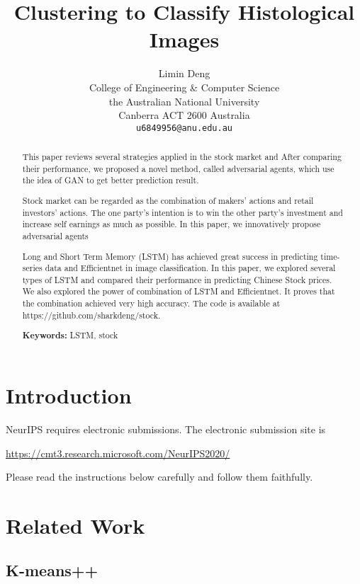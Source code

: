 \documentclass{article}
\title{Clustering to Classify Histological Images}
\author{%
  Limin Deng\\
  College of Engineering \& Computer Science \\
  the Australian National University\\
  Canberra ACT 2600 Australia\\
  \texttt{u6849956@anu.edu.au} \\
}
\begin{document}
\maketitle

\begin{abstract}

This paper reviews several strategies applied in the stock market and After comparing their performance, we proposed a novel method, called adversarial agents, which use the idea of GAN to get better prediction result. 

Stock market can be regarded as the combination of makers' actions and retail investors' actions. The one party's intention is to win the other party's investment and increase self earnings as much as possible. In this paper, we innovatively propose adversarial agents 

Long and Short Term Memory (LSTM) has achieved great success in predicting time-series data and Efficientnet in image classification. In this paper, we explored several types of LSTM and compared their performance in predicting Chinese Stock prices. We also explored the power of combination of LSTM and Efficientnet. It proves that the combination achieved very high accuracy.  
The code is available at https://github.com/sharkdeng/stock. \par
\textbf{Keywords:} LSTM, stock
\end{abstract}

\section{Introduction}

NeurIPS requires electronic submissions.  The electronic submission site is
\begin{center}
  \url{https://cmt3.research.microsoft.com/NeurIPS2020/}
\end{center}

Please read the instructions below carefully and follow them faithfully.





\section{Related Work}

\subsection{K-means++}
\end{document}
